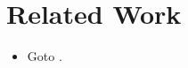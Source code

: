 \documentclass[\main/thesis.tex]{subfiles}
\begin{document}
\chapter{Related Work}
\label{cha:related}

\begin{itemize}
  \item Goto \autocite{2008goto}.
\end{itemize}
\end{document}

